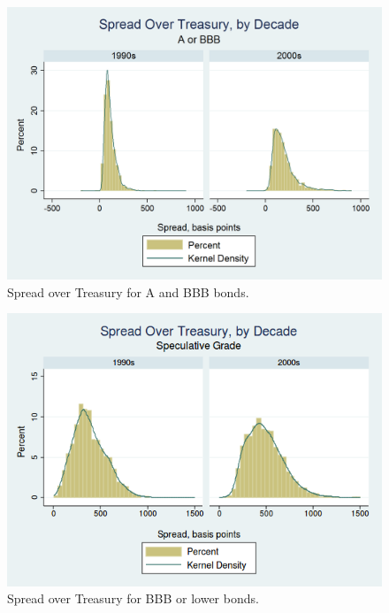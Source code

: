 \documentclass[notitlepage]{article}
\begin{document}
\begin{figure}[ht]
\centering
\includegraphics[width=\textwidth]{Spread_LoIG.png}
\caption{Spread over Treasury for A and BBB bonds.}
\label{fig:spdLO}
\end{figure}

\begin{figure}[ht]
\centering
\includegraphics[width=\textwidth]{Spread_SG.png}
\caption{Spread over Treasury for BBB or lower bonds.}
\label{fig:spdSG}
\end{figure}
\end{document}
